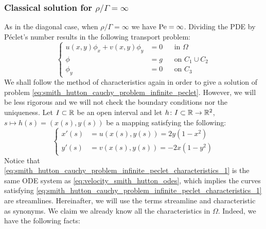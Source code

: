 \subsubsection{Classical solution for \texorpdfstring{$\rho / \Gamma =
\infty$}{infinite rho/Gamma quotient}}

As in the diagonal case, when $\rho / \Gamma = \infty$ we have $\mathrm{Pe} =
\infty$. Dividing the PDE by Péclet's number results in the following transport
problem:
\begin{equation} \label{eq:smith_hutton_cauchy_problem_infinite_peclet} 
	\left\{
	\begin{aligned}
		u(x,y) \phi_x + v(x,y) \phi_y &= 0 	& &\text{in } \Omega \\
		\phi &= g 							& &\text{on } C_1 \cup C_2 \\
		\phi_y &= 0 						& &\text{on } C_3
	\end{aligned}
	\right.
\end{equation}
We shall follow the method of characteristics again in order to give a solution
of problem \eqref{eq:smith_hutton_cauchy_problem_infinite_peclet}. However, we
will be less rigorous and we will not check the boundary conditions nor the
uniqueness. Let $I \subset \mathbb{R}$ be an open interval and let $h \colon I
\subset \mathbb{R} \to \mathbb{R}^2$, $s \mapsto h(s) = (x(s), y(s))$ be a mapping
satisfying the following:
\begin{equation} \label{eq:smith_hutton_cauchy_problem_infinite_peclet_characteristics_1} 
	\left\{
	\begin{aligned}
		x'(s) &= u(x(s), y(s)) = 2 y (1 - x^2) \\
		y'(s) &= v(x(s), y(s)) = - 2 x (1 - y^2)
	\end{aligned}
	\right.
\end{equation}
Notice that
\eqref{eq:smith_hutton_cauchy_problem_infinite_peclet_characteristics_1} is the
same ODE system as \eqref{eq:velocity_smith_hutton_odes}, which implies the
curves satisfying
\eqref{eq:smith_hutton_cauchy_problem_infinite_peclet_characteristics_1} are
streamlines. Hereinafter, we will use the terms streamline and characteristic as
synonyms. We claim we already know all the characteristics in $\Omega$. Indeed,
we have the following facts:
